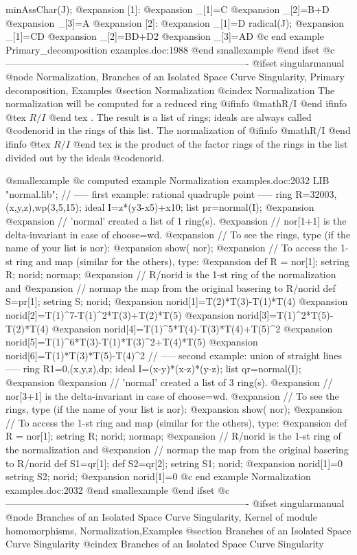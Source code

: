   minAssChar(J);
@expansion{} [1]:
@expansion{}    _[1]=C
@expansion{}    _[2]=B+D
@expansion{}    _[3]=A
@expansion{} [2]:
@expansion{}    _[1]=D
  radical(J);
@expansion{} _[1]=CD
@expansion{} _[2]=BD+D2
@expansion{} _[3]=AD
@c end example Primary_decomposition examples.doc:1988
@end smallexample
@end ifset
@c ----------------------------------------------------------------------------
@ifset singularmanual
@node Normalization, Branches of an Isolated Space Curve Singularity, Primary decomposition, Examples
@section Normalization
@cindex Normalization
The normalization will be computed for a reduced ring 
@ifinfo
@math{R/I}
@end ifinfo
@tex
$R/I$
@end tex
. The
result is a list of rings; ideals are always called @code{norid} in the
rings of this list. The normalization of 
@ifinfo
@math{R/I}
@end ifinfo
@tex
$R/I$
@end tex
 is the product of
the factor rings of the rings in the list divided out by the ideals
@code{norid}.

@smallexample
@c computed example Normalization examples.doc:2032 
  LIB "normal.lib";
  // ----- first example: rational quadruple point -----
  ring R=32003,(x,y,z),wp(3,5,15);
  ideal I=z*(y3-x5)+x10;
  list pr=normal(I);
@expansion{} 
@expansion{} // 'normal' created a list of 1 ring(s).
@expansion{} // nor[1+1] is the delta-invariant in case of choose=wd.
@expansion{} // To see the rings, type (if the name of your list is nor):
@expansion{}      show( nor);
@expansion{} // To access the 1-st ring and map (similar for the others), type:
@expansion{}      def R = nor[1]; setring R;  norid; normap;
@expansion{} // R/norid is the 1-st ring of the normalization and
@expansion{} // normap the map from the original basering to R/norid
  def S=pr[1];
  setring S;
  norid;
@expansion{} norid[1]=T(2)*T(3)-T(1)*T(4)
@expansion{} norid[2]=T(1)^7-T(1)^2*T(3)+T(2)*T(5)
@expansion{} norid[3]=T(1)^2*T(5)-T(2)*T(4)
@expansion{} norid[4]=T(1)^5*T(4)-T(3)*T(4)+T(5)^2
@expansion{} norid[5]=T(1)^6*T(3)-T(1)*T(3)^2+T(4)*T(5)
@expansion{} norid[6]=T(1)*T(3)*T(5)-T(4)^2
  // ----- second example: union of straight lines -----
  ring R1=0,(x,y,z),dp;
  ideal I=(x-y)*(x-z)*(y-z);
  list qr=normal(I);
@expansion{} 
@expansion{} // 'normal' created a list of 3 ring(s).
@expansion{} // nor[3+1] is the delta-invariant in case of choose=wd.
@expansion{} // To see the rings, type (if the name of your list is nor):
@expansion{}      show( nor);
@expansion{} // To access the 1-st ring and map (similar for the others), type:
@expansion{}      def R = nor[1]; setring R;  norid; normap;
@expansion{} // R/norid is the 1-st ring of the normalization and
@expansion{} // normap the map from the original basering to R/norid
  def S1=qr[1]; def S2=qr[2];
  setring S1; norid;
@expansion{} norid[1]=0
  setring S2; norid;
@expansion{} norid[1]=0
@c end example Normalization examples.doc:2032
@end smallexample
@end ifset
@c ----------------------------------------------------------------------------
@ifset singularmanual
@node Branches of an Isolated Space Curve Singularity, Kernel of module homomorphisms, Normalization,Examples
@section Branches of an Isolated Space Curve Singularity
@cindex Branches of an Isolated Space Curve Singularity

